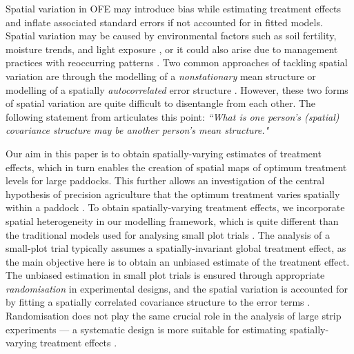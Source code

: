 \documentclass[a4paper]{article}   	%
\begin{document}
	
	Spatial variation in OFE may introduce bias while estimating treatment effects and inflate associated standard errors if not accounted for in fitted models. Spatial variation may be caused by environmental factors such as soil fertility, moisture trends, and light exposure \parencite{Selle2019Flexible}, or it could also arise due to management practices with reoccurring patterns \parencite{Gilmour1997Accounting, Hinkelmann2012Design}. Two common approaches of tackling spatial variation are through the modelling of a \emph{nonstationary} mean structure or modelling of a spatially \emph{autocorrelated} error structure \parencite{Fotheringham2009Problem, Harris2019Simulation}. However, these two forms of spatial variation are quite difficult to disentangle from each other. The following statement from \parencite{Cressie1993Statistics} articulates this point: \textit{``What is one person's (spatial) covariance structure may be another person's mean structure."} 
	
	
	Our aim in this paper is to obtain spatially-varying estimates of treatment effects, which in turn enables the creation of spatial maps of optimum treatment levels for large paddocks. This further allows an investigation of the central hypothesis of precision agriculture that the optimum treatment  varies spatially within a paddock \parencite{Paez2002General, Brunsdon1999Notes, Lark2003Methoda, Pringle2010Analysis}. To obtain spatially-varying treatment effects, we incorporate spatial heterogeneity in our modelling framework, which is quite different than the traditional models used for analysing small plot trials \parencite{Rakshit2020Novel, Piepho2011Statistical}. The analysis of a small-plot trial typically assumes a spatially-invariant global treatment effect, as the main objective here is to obtain an unbiased estimate of the treatment effect. The unbiased estimation in small plot trials is ensured through appropriate \emph{randomisation} in experimental designs, and the spatial variation is accounted for by fitting a spatially correlated covariance structure to the error terms \parencite{Gilmour1997Accounting, Stefanova2009Enhanced}. Randomisation does not play the same crucial role in the analysis of large strip experiments --- a systematic design is more suitable for estimating spatially-varying treatment effects \parencite{Rakshit2020Novel, Piepho2011Statistical, Evans2020Assessment}. 
	
\end{document}
